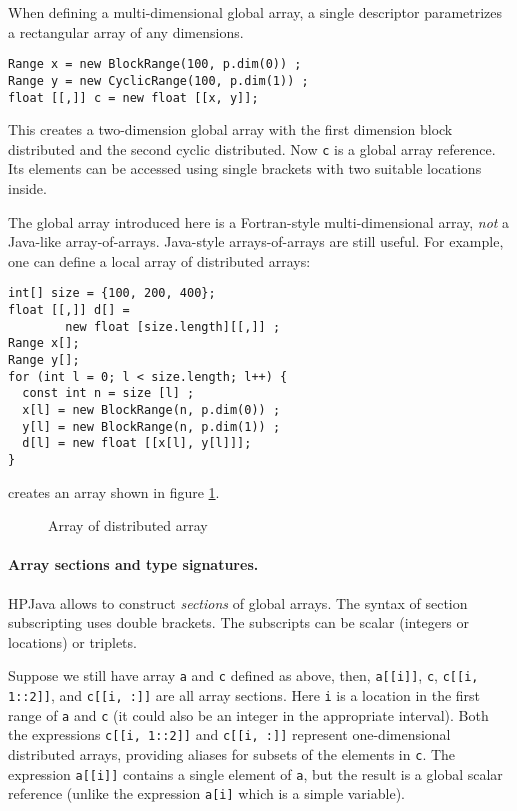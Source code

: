 When defining a multi-dimensional global array, a single descriptor
parametrizes a rectangular array of any dimensions.
\small
\begin{verbatim}
Range x = new BlockRange(100, p.dim(0)) ;  
Range y = new CyclicRange(100, p.dim(1)) ;
float [[,]] c = new float [[x, y]];
\end{verbatim}
\normalsize
This creates a two-dimension global array with the first dimension
block distributed and the second cyclic distributed.  Now \texttt{c} is a
global array reference.  Its elements can be accessed using
single brackets with two suitable locations inside.

The global array introduced here is a Fortran-style multi-dimensional
array, {\em not} a Java-like array-of-arrays.
Java-style arrays-of-arrays are still useful. For example, one can
define a local array of distributed arrays:
\small
\begin{verbatim}
int[] size = {100, 200, 400};
float [[,]] d[] = 
        new float [size.length][[,]] ;
Range x[];
Range y[];
for (int l = 0; l < size.length; l++) {
  const int n = size [l] ;
  x[l] = new BlockRange(n, p.dim(0)) ;  
  y[l] = new BlockRange(n, p.dim(1)) ;  
  d[l] = new float [[x[l], y[l]]];
}
\end{verbatim}
\normalsize
creates an array shown in figure \ref{fig:layer}.

\begin{figure}[htbp]
  \begin{center}
    \leavevmode
    \caption{Array of distributed array}
    \label{fig:layer}
  \end{center}
\end{figure}

\paragraph{Array sections and type signatures.}

HPJava allows to construct {\em sections} of global arrays.  The syntax
of section subscripting uses double brackets.  The subscripts can be
scalar (integers or locations) or triplets.

Suppose we still have array \texttt{a} and \texttt{c} defined as
above, then, \texttt{a[[i]]}, \texttt{c}, \texttt{c[[i, 1::2]]},
and \texttt{c[[i, :]]} are all array sections.  Here {\tt i} is a
location in the first range of {\tt a} and {\tt c} (it could also
be an integer in the appropriate interval).
Both the expressions \texttt{c[[i, 1::2]]} and \texttt{c[[i, :]]}
represent one-dimensional distributed arrays, providing aliases for
subsets of the elements in \texttt{c}.  The expression \texttt{a[[i]]}
contains a single element of \texttt{a}, but the result is a global
scalar reference (unlike the expression \texttt{a[i]} which is a simple
variable).

